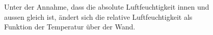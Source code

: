 \begin{figure}[H]
\centering
\caption{Unter der Annahme, dass die absolute Luftfeuchtigkeit innen und aussen gleich ist, ändert sich die relative Luftfeuchtigkeit als Funktion der Temperatur über der Wand.}
\label{fig_Ir}
\end{figure}




















